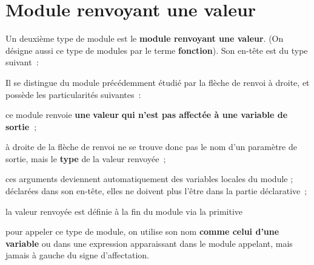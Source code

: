 \section{Module renvoyant une valeur}

	Un deuxième type de module est le 
	\textbf{module renvoyant une valeur}. 
	(On désigne aussi ce type de modules par le terme \textbf{fonction}).
	Son en-tête est du type suivant~:


	Il se distingue du module précédemment étudié par la flèche de renvoi à
	droite, et possède les particularités suivantes~:

	\begin{liste}
	\item {
		{ce module renvoie
		}{\textbf{une}}{
		}{\textbf{valeur}}{
		}{\textbf{qui n’est pas affectée à une variable
		de
		}}{\textbf{sortie~}}{;}}
	\item {
		{à droite de la flèche de renvoi ne se trouve
		donc pas le nom d’un paramètre de sortie, mais le
		}{\textbf{type}}{ de la
		valeur renvoyée~;}}
	\item {
		}
	\item {
		}
	\item {
		ces arguments deviennent automatiquement des variables locales du module 
		; déclarées dans son en-tête, elles ne doivent plus l’être dans la
		partie déclarative~;}
	\item {
		{la valeur renvoyée est définie à la fin du
		module via la primitive
		}}
	\item {
		pour appeler ce type de module, on utilise son nom \textbf{comme celui
		d’une variable} ou dans une expression apparaissant 
		dans le module appelant, mais jamais à gauche du signe
		d’affectation.}
	\end{liste}

